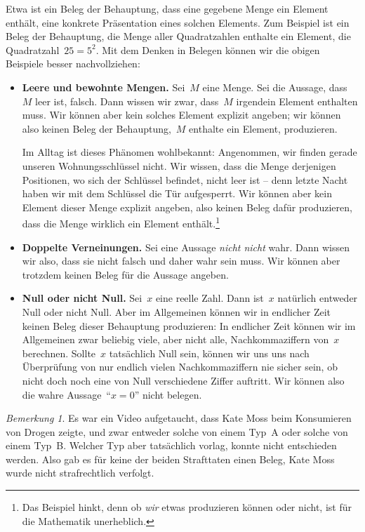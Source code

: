 \documentclass[twoside]{../zirkelblatt}
\theoremstyle{definition}
\theoremstyle{plain}
\theoremstyle{remark}
\newtheorem{bem}[defn]{Bemerkung}
\begin{document}
Etwa ist ein Beleg der Behauptung, dass eine gegebene Menge ein Element
enthält, eine konkrete Präsentation eines solchen Elements. Zum Beispiel ist ein Beleg der
Behauptung, die Menge aller Quadratzahlen enthalte ein Element, die
Quadratzahl~$25 = 5^2$. Mit dem Denken in Belegen können wir die obigen
Beispiele besser nachvollziehen:

\begin{itemize}
\item \textbf{Leere und bewohnte Mengen.} Sei~$M$ eine Menge. Sei die Aussage,
dass~$M$ leer ist, falsch. Dann wissen wir zwar, dass~$M$ irgendein Element
enthalten muss. Wir können aber kein solches Element explizit angeben; wir
können also keinen Beleg der Behauptung,~$M$ enthalte ein Element, produzieren.

Im Alltag ist dieses Phänomen wohlbekannt: Angenommen, wir finden gerade unseren
Wohnungsschlüssel nicht. Wir wissen, dass die Menge derjenigen Positionen, wo
sich der Schlüssel befindet, nicht leer ist -- denn letzte Nacht haben wir mit
dem Schlüssel die Tür aufgesperrt. Wir können aber kein Element dieser Menge
explizit angeben, also keinen Beleg dafür produzieren, dass die Menge wirklich
ein Element enthält.\footnote{Das Beispiel hinkt, denn ob \emph{wir} etwas
produzieren können oder nicht, ist für die Mathematik unerheblich.}
\item \textbf{Doppelte Verneinungen.} Sei eine Aussage \emph{nicht nicht} wahr.
Dann wissen wir also, dass sie nicht falsch und daher wahr sein muss. Wir
können aber trotzdem keinen Beleg für die Aussage angeben.
\item \textbf{Null oder nicht Null.} Sei~$x$ eine reelle Zahl. Dann ist~$x$
natürlich entweder Null oder nicht Null. Aber im Allgemeinen können wir in
endlicher Zeit keinen Beleg dieser Behauptung produzieren: In endlicher Zeit
können wir im Allgemeinen zwar beliebig viele, aber nicht alle,
Nachkommaziffern von~$x$ berechnen. Sollte~$x$ tatsächlich Null sein, können
wir uns uns nach Überprüfung von nur endlich vielen Nachkommaziffern nie sicher
sein, ob nicht doch noch eine von Null verschiedene Ziffer auftritt. Wir können
also die wahre Aussage~"`$x = 0$"' nicht belegen.
\end{itemize}

\begin{bem}
Es war ein Video aufgetaucht, dass Kate Moss beim Konsumieren von Drogen zeigte,
und zwar entweder solche von einem Typ~A oder solche von einem Typ~B. Welcher
Typ aber tatsächlich vorlag, konnte nicht entschieden werden. Also gab es für
keine der beiden Strafttaten einen Beleg, Kate Moss wurde nicht
strafrechtlich verfolgt.
\end{bem}
\end{document}
